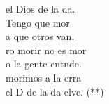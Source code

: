 \begin{cancion}
\begin{chorus}
	 el Dios de la da.\\
	Tengo que mor\\
	a que otros van.\\
	ro morir no es mor\\
	o la gente entnde.\\
	morimos a la erra\\
	el D de la da elve. (**)\\
	\end{chorus}%
	\jump\\
\end{cancion}%
